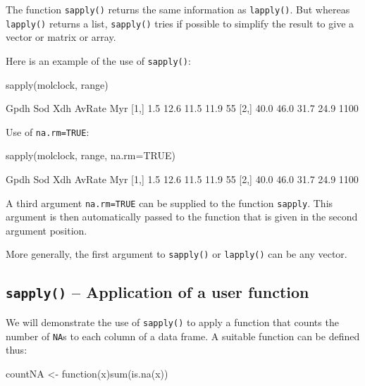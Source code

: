 \documentclass{tufte-book}\usepackage[]{graphicx}\usepackage[]{color}
\newcommand{\txtt}[1]{\texttt{#1}}
\newcommand{\margtt}[1]{{\footnotesize \texttt{#1}}}
\begin{document}
The function \txtt{sapply()} returns the  same
information as \txtt{lapply()}. But whereas \txtt{lapply()} returns a
list, \txtt{sapply()} tries if possible to simplify the result to give
a vector or matrix or array.

Here is an example of the use of \txtt{sapply()}:
\begin{Schunk}
\begin{Sinput}
sapply(molclock, range)
\end{Sinput}
\begin{Soutput}
     Gpdh  Sod  Xdh AvRate  Myr
[1,]  1.5 12.6 11.5   11.9   55
[2,] 40.0 46.0 31.7   24.9 1100
\end{Soutput}
\end{Schunk}

\begin{marginfigure}[68pt]
Use of \margtt{na.rm=TRUE}:
\begin{Schunk}
\begin{Sinput}
sapply(molclock, range,
       na.rm=TRUE)
\end{Sinput}
\begin{Soutput}
     Gpdh  Sod  Xdh AvRate  Myr
[1,]  1.5 12.6 11.5   11.9   55
[2,] 40.0 46.0 31.7   24.9 1100
\end{Soutput}
\end{Schunk}
\end{marginfigure}
A third argument \txtt{na.rm=TRUE}
can be supplied to the function \txtt{sapply}.  This argument is then
automatically passed to the function that is given in the second
argument position.

More generally, the first argument to \txtt{sapply()} or
\txtt{lapply()} can be any vector.

\subsection*{\txtt{sapply()} -- Application of a user function}
We will demonstrate the use of \txtt{sapply()} to apply a function
that counts the number of \txtt{NA}s to each column of a data frame.
A suitable function can be defined thus:
\begin{Schunk}
\begin{Sinput}
countNA <- function(x)sum(is.na(x))
\end{Sinput}
\end{Schunk}
\end{document}
